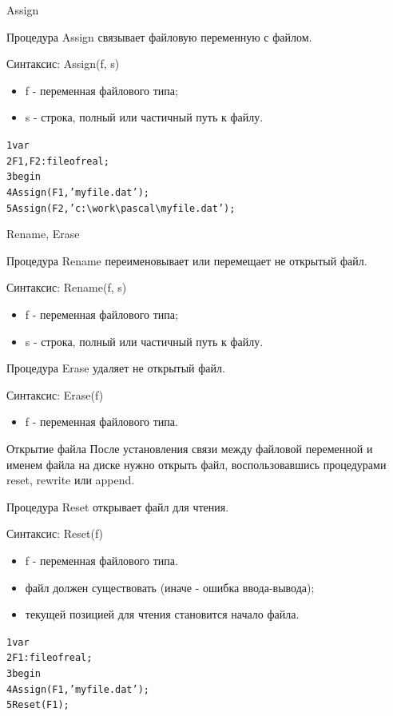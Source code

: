 \documentclass{beamer}
\begin{document}
\begin{frame}[fragile]{Assign}
\begin{block}{Процедура Assign}
связывает файловую переменную с файлом.
\end{block}
Синтаксис: Assign(f, s)
\begin{itemize}
\item f - переменная файлового типа;
\item s - строка, полный или частичный путь к файлу. 
\end{itemize}
\begin{alltt}
 1 var                  
 2   F1, F2: file of real;
 3 begin
 4   Assign(F1, 'myfile.dat');
 5   Assign(F2, 'c:\textbackslash work\textbackslash pascal\textbackslash myfile.dat');
\end{alltt}
\end{frame} 

\begin{frame}[fragile]{Rename, Erase}
\begin{block}{Процедура Rename}
переименовывает или перемещает не открытый файл.
\end{block}
Синтаксис: Rename(f, s)
\begin{itemize}
\item f - переменная файлового типа;
\item s - строка, полный или частичный путь к файлу. 
\end{itemize}
\begin{block}{Процедура Erase}
удаляет не открытый файл.
\end{block}
Синтаксис: Erase(f)
\begin{itemize}
\item f - переменная файлового типа.
\end{itemize}
\end{frame} 

\begin{frame}[fragile]{Открытие файла}
После установления связи между файловой переменной и именем файла на диске нужно открыть файл, воспользовавшись процедурами reset, rewrite или append.
\begin{block}{Процедура Reset}
открывает файл для чтения.
\end{block}
Синтаксис: Reset(f)
\begin{itemize}
\item f - переменная файлового типа.
\item файл должен существовать (иначе - ошибка ввода-вывода);
\item текущей позицией для чтения становится начало файла.
\end{itemize}
\begin{alltt}
 1 var                  
 2   F1: file of real;
 3 begin
 4   Assign(F1, 'myfile.dat');
 5   Reset(F1);
\end{alltt}
\end{frame} 
\end{document}
